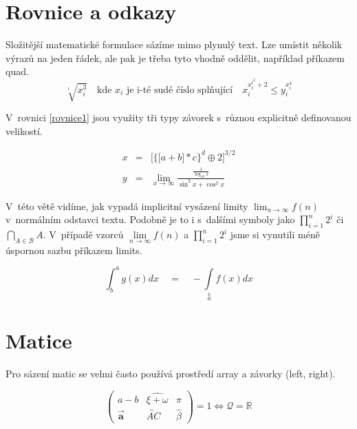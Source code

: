 \documentclass[11pt, a4paper, twocolumn]{article}
\theoremstyle{definition}
\begin{document}
\section{Rovnice a odkazy}
\label{rovnice}

Složitější matematické formulace sázíme mimo plynulý
text. Lze umístit několik výrazů na jeden řádek, ale pak je
třeba tyto vhodně oddělit, například příkazem {\selectfont {}quad}.
\\
$$\sqrt[i]{x_i^3}\quad \text{kde } x_i \text{ je i-té sudé číslo splňující}\quad x_i^{x_i^{i^2}+2} \leq y_i^{x_i^4}$$

V~rovnici \eqref{rovnice1} jsou využity tři typy závorek s~různou
explicitně definovanou velikostí.

\begin{eqnarray}
\label{rovnice1}
    x &=& \bigg[\Big\{\big[a+b\big]*c\Big\}^d\oplus 2\bigg]^{3/2}\\
    y&=&\lim_{x \rightarrow \infty}\frac{\frac{1}{\log_{10} x}}{\sin^2 x + \cos^2 x} \nonumber
\end{eqnarray}

V~této větě vidíme, jak vypadá implicitní vysázení limity $\lim_{n\rightarrow \infty}f(n)$ v~normálním odstavci textu. 
Podobně je to i s~dalšími symboly jako $\prod^n_{i=1}2^i$ či $\bigcap_{A\in \mathcal{B}}A$.
V~případě vzorců $\lim\limits_{n\rightarrow \infty}f(n)$ a
$\prod\limits^n_{i=1}2^i$ jsme si vynutili méně
úspornou sazbu příkazem {\selectfont {}limits}.


\begin{equation}
\label{rovnice2}
    \int_b^a g(x)dx\quad =\quad -\int\limits_{a}\limits^{b} f(x)dx
\end{equation}


\section{Matice}
Pro sázení matic se velmi často používá prostředí {\selectfont array}
a závorky ({\selectfont {}left}, {\selectfont {}right}).

$$
\left(\begin{array}{ccc}
a-b & \widehat{\xi+\omega} & \pi \\
\vec{\mathbf{a}} & \overleftrightarrow{A C} & \hat{\beta}
\end{array}
\right)
= 1 \Longleftrightarrow \mathcal{Q}=\mathbb{R}
$$
\end{document}

